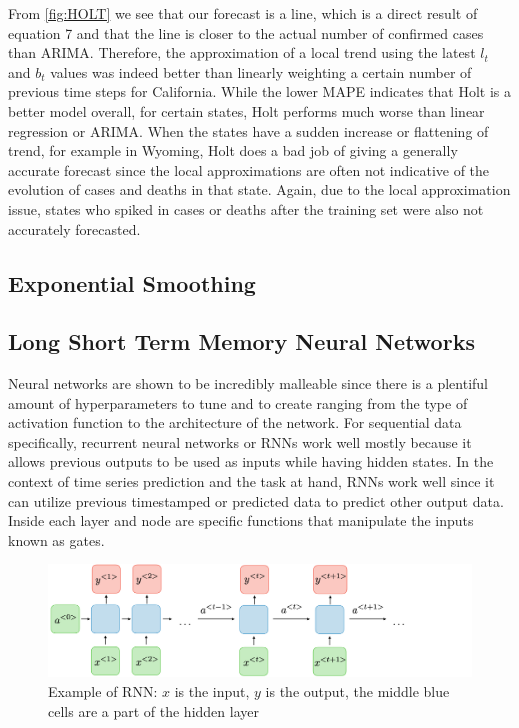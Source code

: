 \documentclass[sigconf,nonacm]{acmart}
\begin{document}
From \ref{fig:HOLT} we see that our forecast is a line, which is a direct
result of equation 7 and that the line is closer to the actual number of
confirmed cases than ARIMA. Therefore, the approximation of a local trend using
the latest $l_t$ and $b_t$ values was indeed better than linearly weighting a
certain number of previous time steps for California. While the lower MAPE
indicates that Holt is a better model overall, for certain states, Holt
performs much worse than linear regression or ARIMA. When the states have a
sudden increase or flattening of trend, for example in Wyoming, Holt does a bad
job of giving a generally accurate forecast since the local approximations are
often not indicative of the evolution of cases and deaths in that state. Again,
due to the local approximation issue, states who spiked in cases or deaths
after the training set were also not accurately forecasted.

\subsection{Exponential Smoothing}



\subsection{Long Short Term Memory Neural Networks}

Neural networks are shown to be incredibly malleable since there is a plentiful
amount of hyperparameters to tune and to create ranging from the type of
activation function to the architecture of the network. For sequential data
specifically, recurrent neural networks or RNNs work well mostly because it
allows previous outputs to be used as inputs while having hidden states.  
In the context of time series prediction and the task at hand, RNNs work well
since it can utilize previous timestamped or predicted data to predict other
output data. Inside each layer and node are specific functions that manipulate
the inputs known as gates.

\begin{figure}
  \centering
  \includegraphics[width=\linewidth]{figures/architecture-rnn-ltr.png}
  \caption{Example of RNN: $x$ is the input, $y$ is the output, the middle blue
  cells are a part of the hidden layer}
  \label{fig:rnn}
\end{figure}
\end{document}
